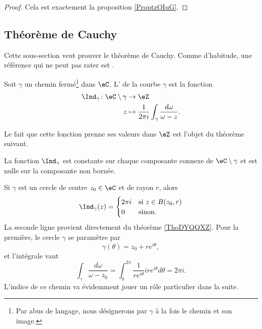 \begin{proof}
    Cela est exactement la proposition \ref{ProptzOIuG}.
\end{proof}

\subsection{Théorème de Cauchy}

Cette sous-section veut prouver le théorème de Cauchy. Comme d'habitude, une référence qui ne peut pas rater est \cite{Holomorphieus}.

\begin{definition}
    Soit \( \gamma\) un chemin fermé\footnote{Par abus de langage, nous désignerons par \( \gamma\) à la fois le chemin et son image.} dans \( \eC\). L' de la courbe \( \gamma\) est la fonction
    \begin{equation}
        \begin{aligned}
            \Ind_{\gamma}\colon \eC\setminus \gamma&\to \eZ \\
            z&\mapsto \frac{1}{ 2\pi i }\int_{\gamma}\frac{ d\omega }{ \omega-z }. 
        \end{aligned}
    \end{equation}
\end{definition}
Le fait que cette fonction prenne ses valeurs dans \( \eZ\) est l'objet du théorème suivant.

\begin{theorem}     \label{ThoDYQQXZ}
    La fonction \( \Ind_{\gamma}\) est constante sur chaque composante connexe de \( \eC\setminus \gamma\) et est nulle sur la composante non bornée.
\end{theorem}

\begin{example} \label{ExradygL}
    Si \( \gamma\) est un cercle de centre \( z_0\in \eC\) et de rayon \( r\), alors 
    \begin{equation}
        \Ind_{\gamma}(z)=\begin{cases}
            2\pi i    &   \text{si \( z\in B(z_0,r)\)}\\
            0    &    \text{sinon}.
        \end{cases}
    \end{equation}
    La seconde ligne provient directement du théorème \ref{ThoDYQQXZ}. Pour la première, le cercle \( \gamma\) se paramètre par
    \begin{equation}
        \gamma(\theta)=z_0+r e^{i\theta},
    \end{equation}
    et l'intégrale vaut
    \begin{equation}
        \int_{\gamma}\frac{ d\omega }{ \omega-z_0 }=\int_0^{2\pi}\frac{1}{ r e^{i\theta} }ir e^{i\theta}d\theta=2\pi i.
    \end{equation}
    L'indice de ce chemin va évidemment jouer un rôle particulier dans la suite.
\end{example}

